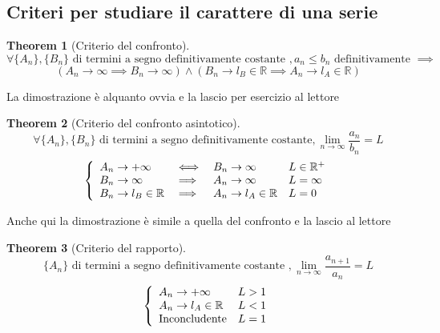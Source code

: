 \documentclass{article}
\newtheorem{theorem}{Theorem}[section]
\begin{document}
    \subsection{Criteri per studiare il carattere di una serie}
        \begin{theorem}[Criterio del confronto]
            $$\forall \{A_n\}, \{B_n\} \textrm{ di termini a segno definitivamente costante }, a_n \leq b_n \textrm{ definitivamente } \implies$$
            $$\left(A_n \to \infty \implies B_n \to \infty\right) \land 
                \left(B_n \to l_B \in \mathbb{R} \implies A_n \to l_A \in \mathbb{R}\right)$$
        \end{theorem}
        La dimostrazione è alquanto ovvia e la lascio per esercizio al lettore
        \begin{theorem}[Criterio del confronto asintotico]
            $$\forall \{A_n\}, \{B_n\} \textrm{ di termini a segno definitivamente costante}, \lim_{n \to \infty }\frac{a_n}{b_n} = L$$
            \begin{equation}
                \left\{\begin{array}{l l l l}
                    A_n \to +\infty & \iff & B_n \to \infty & L \in \mathbb{R}^+ \\
                    B_n \to \infty & \implies & A_n \to \infty & L = \infty \\
                    B_n \to l_B \in \mathbb{R} & \implies & A_n \to l_A \in \mathbb{R} & L = 0 \\
                \end{array}\right.
            \end{equation}
        \end{theorem}
        Anche qui la dimostrazione è simile a quella del confronto e la lascio al lettore
        \begin{theorem}[Criterio del rapporto]
            $$\{A_n\} \textrm{ di termini a segno definitivamente costante }, \lim_{n \to \infty}\frac{a_{n+1}}{a_n} = L$$
            \begin{equation}
                \left\{\begin{array}{l l}
                    A_n \to +\infty & L > 1 \\
                    A_n \to l_A \in \mathbb{R} & L < 1 \\
                    \textrm{Inconcludente} & L = 1 \\
                \end{array}\right.
            \end{equation}
        \end{theorem}
\end{document}
